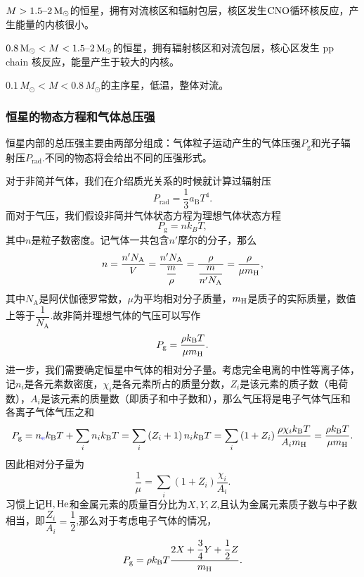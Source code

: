 \documentclass[../天体物理基础.tex]{subfiles}
\begin{document}
$M>1.5\text{\textendash}2\,\unit{M_{\odot}}$的恒星，拥有对流核区和辐射包层，核区发生$\ce{CNO}$循环核反应，产生能量的内核很小。

$0.8\,\unit{M_{\odot}}<M<1.5\text{\textendash}2\,\unit{M_{\odot}}$的恒星，拥有辐射核区和对流包层，核心区发生 pp chain 核反应，能量产生于较大的内核。

$0.1\,\unit{M_{\odot}}<M<0.8\,\unit{M_{\odot}}$的主序星，低温，整体对流。

\subsubsection{恒星的物态方程和气体总压强}
恒星内部的总压强主要由两部分组成：气体粒子运动产生的气体压强$P_{\text{g}}$和光子辐射压$P_{\text{rad}}$.不同的物态将会给出不同的压强形式。

对于非简并气体，我们在介绍质光关系的时候就计算过辐射压
\begin{equation}
P_{\text{rad}}=\frac{1}{3}a_{\text{B}}T^{4}.
\end{equation}
而对于气压，我们假设非简并气体状态方程为理想气体状态方程
\begin{equation}
P_{\text{g}}=nk_{B}T,
\end{equation}
其中$n$是粒子数密度。记气体一共包含$n'$摩尔的分子，那么
\begin{equation}
n=\frac{n'N_{\text{A}}}{V}=\frac{n'N_{\text{A}}}{\dfrac{m}{\rho}}=\frac{\rho}{\dfrac{m}{n'N_{\text{A}}}}=\frac{\rho}{\mu m_{\ce{H}}},
\end{equation}
其中$N_{\text{A}}$是阿伏伽德罗常数，$\mu$为平均相对分子质量，$m_{\ce{H}}$是质子的实际质量，数值上等于$\dfrac{1}{N_{\text{A}}}$.故非简并理想气体的气压可以写作
\begin{equation}
P_{\text{g}}=\frac{\rho k_{\text{B}}T}{\mu m_{\ce{H}}}.
\end{equation}
进一步，我们需要确定恒星中气体的相对分子量。考虑完全电离的中性等离子体，记$n_{i}$是各元素数密度，$\chi_{i}$是各元素所占的质量分数，$Z_{i}$是该元素的质子数（电荷数），$A_{i}$是该元素的质量数（即质子和中子数和），那么气压将是电子气体气压和各离子气体气压之和
\begin{equation}
P_{\text{g}}=n_{{\color{blue}{\ce{e}}}}k_{\text{B}}T+\sum_{i}n_{i}k_{\text{B}}T=\sum_{i}\left(Z_{i}+1\right)n_{i}k_{\text{B}}T=\sum_{i}\left(1+Z_{i}\right)\frac{\rho\chi_{i}k_{\text{B}}T}{A_{i}m_{\ce{H}}}=\frac{\rho k_{\text{B}}T}{\mu m_{\ce{H}}}.
\end{equation}
因此相对分子量为
\begin{equation}
\frac{1}{\mu}=\sum_{i}\left(1+Z_{i}\right)\frac{\chi_{i}}{A_{i}}.
\end{equation}
习惯上记$\ce{H},\ce{He}$和金属元素的质量百分比为$X,Y,Z$,且认为金属元素质子数与中子数相当，即$\dfrac{Z_{i}}{A_{i}}=\dfrac{1}{2}$,那么对于考虑电子气体的情况，
\begin{equation}
P_{\text{g}}=\rho k_{\text{B}}T\frac{2X+\dfrac{3}{4}Y+\dfrac{1}{2}Z}{m_{\ce{H}}}.
\end{equation}
\end{document}
